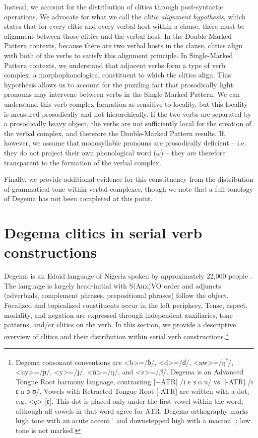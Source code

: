 Instead, we account for the distribution of clitics through post-syntactic operations. We advocate for what we call the \textit{clitic alignment hypothesis}, which states that for every clitic and every verbal host within a clause, there must be alignment between those clitics and the verbal host. In the Double-Marked Pattern contexts, because there are two verbal hosts in the clause, clitics align with both of the verbs to satisfy this alignment principle. In Single-Marked Pattern contexts, we understand that adjacent verbs form a type of verb complex, a morphophonological constituent to which the clitics align. This hypothesis allows us to account for the puzzling fact that prosodically light pronouns may intervene between verbs in the Single-Marked Pattern. We can understand this verb complex formation as sensitive to locality, but this locality is measured prosodically and not hierarchically. If the two verbs are separated by a prosodically heavy object, the verbs are not sufficiently local for the creation of the verbal complex, and therefore the Double-Marked Pattern results. If, however, we assume that monosyllabic pronouns are prosodically deficient – i.e. they do not project their own phonological word ($\omega $) – they are therefore transparent to the formation of the verbal complex. 

Finally, we provide additional evidence for this constituency from the distribution of grammatical tone within verbal complexes, though we note that a full tonology of Degema has not been completed at this point. 

\chapter{Degema clitics in serial verb constructions}

Degema is an Edoid language of Nigeria spoken by approximately 22,000 people \citep[5]{Kari2004}. The language is largely head-initial with S(Aux)VO order and adjuncts (adverbials, complement phrases, prepositional phrases) follow the object. Focalized and topicalized constituents occur in the left periphery. Tense, aspect, modality, and negation are expressed through independent auxiliaries, tone patterns, and/or clitics on the verb. In this section, we provide a descriptive overview of clitics and their distribution within serial verb constructions.\footnote{Degema consonant conventions are {\textless}ḅ{\textgreater}=/ɓ/, {\textless}ḍ{\textgreater}=/ɗ/, {\textless}nw{\textgreater}=/ŋ\textsuperscript{ʷ}/, {\textless}ny{\textgreater}=/ɲ/, {\textless}y{\textgreater}=/j/, {\textless}\={n}{\textgreater}=/ŋ/, and {\textless}v{\textgreater}=/$\beta $/. Degema is an Advanced Tongue Root harmony language, contrasting [+ATR] /i e ɜ o u/ vs. [-ATR] /ɪ ɛ a ɔ ʊ/. Vowels with Retracted Tongue Root [-ATR] are written with a dot, e.g. {\textless}ẹ{\textgreater} [ɛ]. This dot is placed only under the first vowel within the word, although all vowels in that word agree for ATR. Degema orthography marks high tone with an acute accent  \'{ } and downstepped high with a macron  \={ } ; low tone is not marked.
} 

